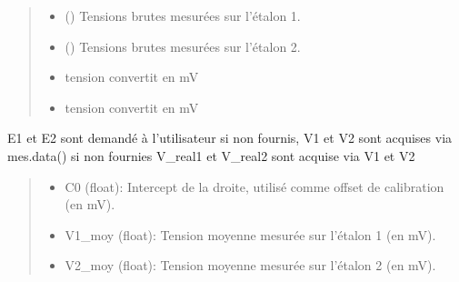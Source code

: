 \documentclass[letterpaper,10pt,english]{sphinxmanual}
\begin{document}
\begin{fulllineitems}
\begin{quote}
\begin{description}
\begin{itemize}
\item {} 
\sphinxAtStartPar
{} (\sphinxstyleliteralemphasis{\sphinxupquote{{[}}}\sphinxstyleliteralemphasis{\sphinxupquote{{]}}}\sphinxstyleliteralemphasis{\sphinxupquote{, }}) \textendash{} Tensions brutes mesurées sur l’étalon 1.

\item {} 
\sphinxAtStartPar
{} (\sphinxstyleliteralemphasis{\sphinxupquote{{[}}}\sphinxstyleliteralemphasis{\sphinxupquote{{]}}}\sphinxstyleliteralemphasis{\sphinxupquote{, }}) \textendash{} Tensions brutes mesurées sur l’étalon 2.

\item {} 
\sphinxAtStartPar
{} \textendash{} tension convertit en mV

\item {} 
\sphinxAtStartPar
{} \textendash{} tension convertit en mV

\end{itemize}

\end{description}\end{quote}

\sphinxAtStartPar
E1 et E2 sont demandé à l’utilisateur si non fournis, V1 et V2 sont acquises via mes.data() si non fournies
V\_real1 et V\_real2 sont acquise via V1 et V2
\begin{quote}\begin{description}
\sphinxAtStartPar
\begin{description}
\begin{itemize}
\item {} 
\sphinxAtStartPar
C0 (float): Intercept de la droite, utilisé comme offset de calibration (en mV).

\item {} 
\sphinxAtStartPar
V1\_moy (float): Tension moyenne mesurée sur l’étalon 1 (en mV).

\item {} 
\sphinxAtStartPar
V2\_moy (float): Tension moyenne mesurée sur l’étalon 2 (en mV).


\end{itemize}
\end{description}
\end{description}
\end{quote}
\end{fulllineitems}
\end{document}
